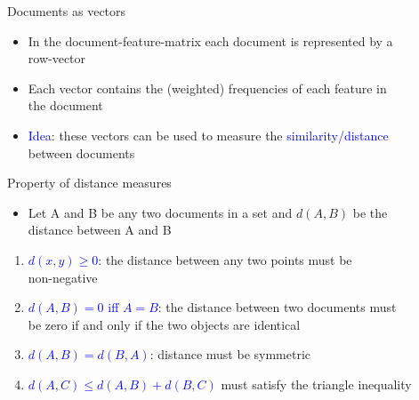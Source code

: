 \documentclass[english]{beamer}
\begin{document}
\begin{frame}{Documents as vectors}
\begin{itemize}
\setlength{\itemsep}{1em}
\setlength{\itemindent}{-0.6em}
\item In the document-feature-matrix each document is represented by a\\
\hspace{-6.5pt}row-vector
\item Each vector contains the (weighted) frequencies of each feature in\\
\hspace{-6.5pt}the document
\item \textcolor{blue}{Idea}: these vectors can be used to measure the \textcolor{blue}{similarity/distance}\\
\hspace{-6.5pt}between documents
\end{itemize}
\end{frame}

\begin{frame}{Property of distance measures}
\begin{itemize}
\setlength{\itemsep}{1em}
\setlength{\itemindent}{-0.6em}
\item Let A and B be any two documents in a set and $d(A,B)$ be the\\
\hspace{-6.5pt}distance between A and B
\end{itemize}
\begin{enumerate}
\setlength{\itemindent}{-0.6em}
\setlength{\itemsep}{1em}
\item \textcolor{blue}{$d(x,y) \geq 0$}: the distance between any two points must be\\
\hspace{-6.5pt}non-negative
\item \textcolor{blue}{$d(A,B) = 0$ iff $A = B$}: the distance between two documents must\\
\hspace{-6.5pt}be zero if and only if the two objects are identical
\item \textcolor{blue}{$d(A,B) = d(B,A)$}: distance must be symmetric
\item \textcolor{blue}{$d(A,C) \leq d(A,B)+d(B,C)$} must satisfy the triangle inequality
\end{enumerate}
\end{frame}
\end{document}
